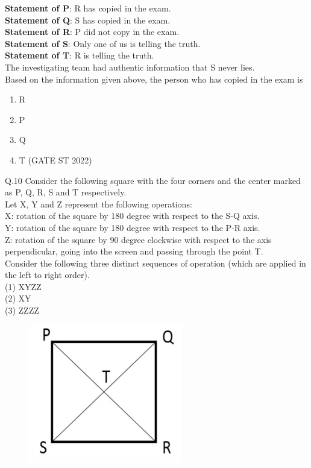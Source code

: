 \documentclass[journal,12pt,onecolumn]{IEEEtran}
\theoremstyle{remark}
\begin{document}
	 \textbf{Statement of P}: R has copied in the exam. \\
	 \textbf{Statement of Q}: S has copied in the exam. \\
	 \textbf{Statement of R}: P did not copy in the exam. \\
	 \textbf{Statement of S}: Only one of us is telling the truth. \\
	 \textbf{Statement of T}: R is telling the truth. \\
	 The investigating team had authentic information that S never lies.\\
	 Based on the information given above, the person who has copied in the exam is
	 \begin{enumerate}[label=(\Alph*)]
	 	\item R
	 	\item P
	 	\item Q
	 	\item T
	 	\hfill (GATE ST 2022)
	 \end{enumerate}
	 	\vspace{2em}
Q.10 Consider the following square with the four corners and the center marked as P, Q, R, S and T respectively.\\
Let X, Y and Z represent the following operations: \\
X: rotation of the square by 180 degree with respect to the S-Q axis.\\
Y: rotation of the square by 180 degree with respect to the P-R axis.\\
Z: rotation of the square by 90 degree clockwise with respect to the axis perpendicular, going into the screen and passing through the point T.\\
Consider the following three distinct sequences of operation (which are applied in the left to right order).\\
(1) XYZZ \\
(2) XY \\
(3) ZZZZ \\
\begin{figure}[H]
	 	\centering
	 	\includegraphics[width=0.2\linewidth]{figs/screenshot003}
	 	\caption{}
	 	\label{fig:screenshot003}
	 	\end{figure}
	 
\end{document}
